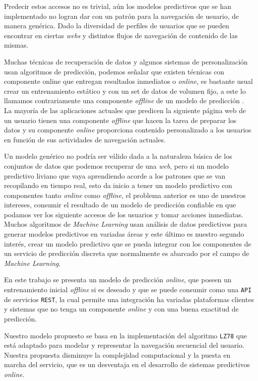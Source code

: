 Predecir estos  accesos no es trivial, aún los modelos predictivos que se han implementado no logran dar con un patrón para la navegación de usuario, de manera genérica. Dado la diversidad de perfiles de usuarios que se pueden encontrar en ciertas \emph{webs}  y distintos flujos de navegación de contenido de las mismas.  

Muchas técnicas de recuperación de datos y algunos sistemas de personalización usan algoritmos de predicción, podemos señalar que existen técnicas con componente online que entregan resultados inmediatos o \emph{online}, es bastante usual crear un entrenamiento estático y con un set de datos de volumen fijo, a este lo llamamos contrariamente una componente \emph{offline} de un modelo de predicción . La mayoría de las aplicaciones actuales que predicen la siguiente página web de un usuario tienen una componente  \emph{offline} que hacen la tarea de preparar los datos y su componente \emph{online}  proporciona contenido personalizado a los usuarios en función de sus actividades de navegación actuales.

Un modelo genérico no podría ser válido dada a la naturaleza básica de los conjuntos de datos que podemos recuperar de una \emph{web}, pero si un modelo predictivo liviano que vaya aprendiendo acorde a los patrones que se van recopilando en tiempo real, esto da inicio a tener un modelo predictivo con componentes tanto \emph{online} como \emph{offline}, el problema anterior es uno de nuestros intereses, consumir el resultado de un modelo de predicción confiable en que podamos ver los siguiente accesos de los usuarios y tomar acciones inmediatas. Muchos algoritmos de \emph{Machine Learning} usan análisis de datos predictivos para generar modelos predictivos en variadas áreas y este último es nuestro segundo interés, crear un modelo predictivo que se pueda integrar con los componentes de un servicio de predicción discreta que normalmente es abarcado por el campo de \emph{Machine Learning}.  

En este trabajo se presenta un modelo de predicción \emph{online}, que poseen un entrenamiento inicial \emph{offline} si es deseado y que se puede consumir como una \texttt{API} de servicios \texttt{REST}, la cual permite una integración ha variadas plataformas clientes y sistemas que no tenga un componente \emph{online} y con una buena exactitud de predicción. 

Nuestro modelo propuesto se basa en la implementación del algoritmo \texttt{LZ78} que está adaptado para modelar y representar la navegación secuencial del usuario. Nuestra propuesta disminuye la complejidad computacional  y la puesta en marcha del servicio, que es un desventaja en el desarrollo de sistemas predictivos \emph{online}.

